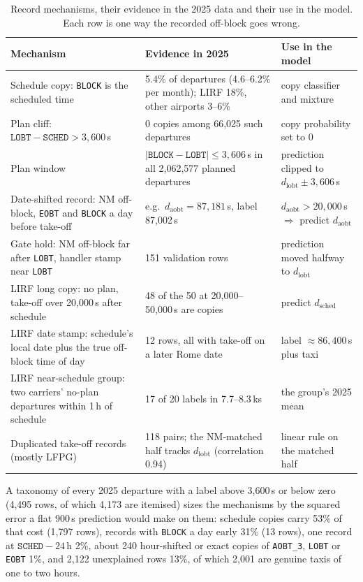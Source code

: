 \documentclass[
  manuscript=article,
  layout=preprint,
  year=2026,
  volume=x,
]{extra/joas}
\newcommand{\fld}[1]{\texttt{#1}}
\begin{document}
\begin{table}[htbp!]
  \centering
  \small
  \caption{Record mechanisms, their evidence in the 2025 data and their use in the model. Each row is one way the recorded off-block goes wrong.}
  \label{tb:mechanisms}
  \begin{tabular}{L{0.25\textwidth}L{0.4\textwidth}L{0.27\textwidth}}
  \toprule
  \textbf{Mechanism} & \textbf{Evidence in 2025} & \textbf{Use in the model} \\
  \midrule
  Schedule copy: \fld{BLOCK} is the scheduled time & 5.4\% of departures (4.6--6.2\% per month); LIRF 18\%, other airports 3--6\% & copy classifier and mixture \\
  Plan cliff: $\fld{LOBT} - \fld{SCHED} > 3{,}600$\,s & 0 copies among 66,025 such departures & copy probability set to 0 \\
  Plan window & $|\fld{BLOCK} - \fld{LOBT}| \le 3{,}606$\,s in all 2,062,577 planned departures & prediction clipped to $d_{\mathrm{lobt}} \pm 3{,}606$\,s \\
  Date-shifted record: NM off-block, \fld{EOBT} and \fld{BLOCK} a day before take-off & e.g.\ $d_{\mathrm{aobt}} = 87{,}181$\,s, label 87,002\,s & $d_{\mathrm{aobt}} > 20{,}000$\,s $\Rightarrow$ predict $d_{\mathrm{aobt}}$ \\
  Gate hold: NM off-block far after \fld{LOBT}, handler stamp near \fld{LOBT} & 151 validation rows & prediction moved halfway to $d_{\mathrm{lobt}}$ \\
  LIRF long copy: no plan, take-off over 20,000\,s after schedule & 48 of the 50 at 20,000--50,000\,s are copies & predict $d_{\mathrm{sched}}$ \\
  LIRF date stamp: schedule's local date plus the true off-block time of day & 12 rows, all with take-off on a later Rome date & label $\approx 86{,}400$\,s plus taxi \\
  LIRF near-schedule group: two carriers' no-plan departures within 1\,h of schedule & 17 of 20 labels in 7.7--8.3\,ks & the group's 2025 mean \\
  Duplicated take-off records (mostly LFPG) & 118 pairs; the NM-matched half tracks $d_{\mathrm{lobt}}$ (correlation 0.94) & linear rule on the matched half \\
  \bottomrule
  \end{tabular}
\end{table}

A taxonomy of every 2025 departure with a label above 3,600\,s or below zero (4,495 rows, of which 4,173 are itemised) sizes the
mechanisms by the squared error a flat 900\,s prediction would make on them: schedule copies carry 53\% of that cost (1,797 rows), records
with \fld{BLOCK} a day early 31\% (13 rows), one record at $\fld{SCHED} - 24$\,h 2\%, about 240 hour-shifted or exact copies of
\fld{AOBT\_3}, \fld{LOBT} or \fld{EOBT} 1\%, and 2,122 unexplained rows 13\%, of which 2,001 are genuine taxis of one to two hours.
\end{document}
